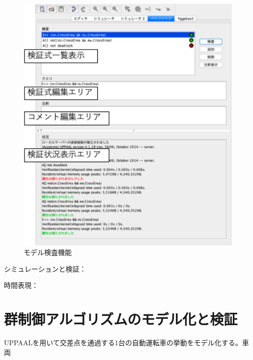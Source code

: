 \documentclass{tpu-sotu}
\begin{document}
	\begin{figure}[htbp]
	\centering
	\includegraphics[width=140mm]{showModelVerification.png}
	\caption{モデル検査機能}
	\label{sMV}
	\end{figure}
	シミュレーションと検証：
	
	時間表現：
	
\chapter{群制御アルゴリズムのモデル化と検証}
UPPAALを用いて交差点を通過する1台の自動運転車の挙動をモデル化する。車両
\end{document}
